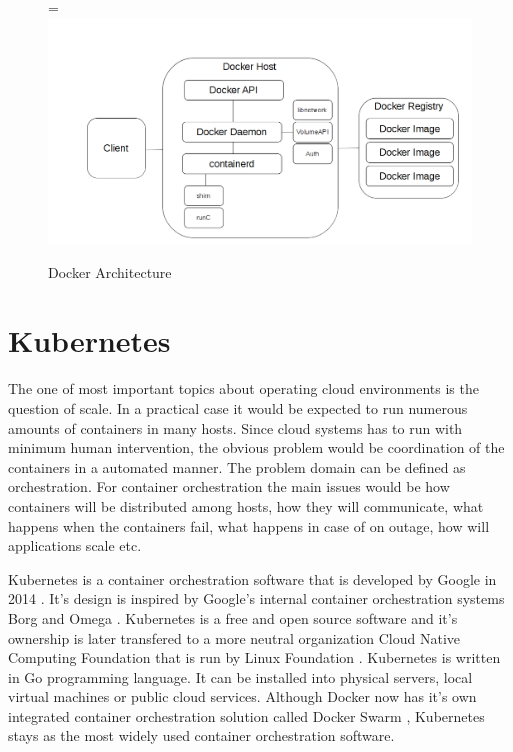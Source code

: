 \documentclass[12pt,oneandhalf,chaparabic,ceng,ms,eng,oneside,pntc]{gsufbe}
\makeatletter
\let\old@includegraphics\includegraphics
\renewcommand{\includegraphics}[2][,]{%
  \setbox9=\hbox{\old@includegraphics[#1]{#2}}%
  \ifdim\wd9>\textwidth
    \old@includegraphics[#1,width=\textwidth]{#2}%
  \else
    \old@includegraphics[#1]{#2}%
  \fi%
}
\makeatother
\begin{document}
\begin{figure}
\centering
\includegraphics[]{docker-arch.png}
\caption{Docker Architecture}
\label{fig:dockerarch}
\end{figure}

\section{Kubernetes}
The one of most important topics about operating cloud environments is the question of scale.  In a
practical case it would be expected to run numerous amounts of containers in many hosts. Since
cloud systems has to run with minimum human intervention, the obvious problem would be coordination
of the containers in a automated manner.  The problem domain can be defined as orchestration.
For container orchestration the main issues would be how containers will be distributed among hosts,
how they will communicate, what happens when the containers fail, what happens in case of on outage,
how will applications scale etc.

Kubernetes is a container orchestration software that is developed by Google in 2014 \cite{Kubernetes}.
It's design is
inspired by Google's internal container orchestration systems Borg and Omega \cite{burns_borg_2016}.
Kubernetes is a free and open source software and it's ownership is later transfered to a more neutral
organization Cloud Native Computing Foundation \cite{cncf} that is run by Linux Foundation
\cite{linux_foundation}.  Kubernetes is written in Go programming language.
It can be installed into physical servers, local virtual machines or public cloud services.  Although
Docker now has it's own integrated container orchestration solution called Docker Swarm 
\cite{docker_swarm}, Kubernetes stays as the most widely used container orchestration software.
\end{document}
